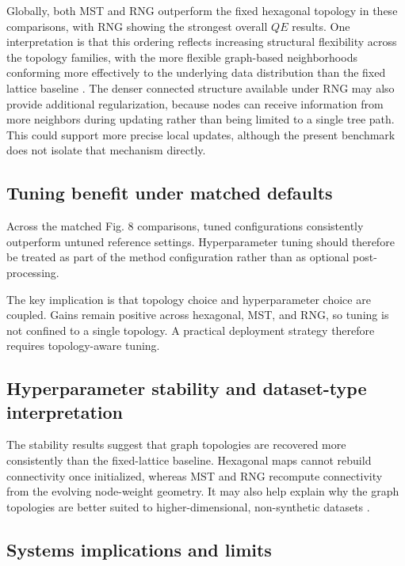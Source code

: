 \documentclass[11pt]{article}
\begin{document}
Globally, both MST and RNG outperform the fixed hexagonal topology in these comparisons, with RNG showing the strongest overall $QE$ results. One interpretation is that this ordering reflects increasing structural flexibility across the topology families, with the more flexible graph-based neighborhoods conforming more effectively to the underlying data distribution than the fixed lattice baseline \citep{kohonenEssentialsSelforganizingMap2013,kangasVariantsSelforganizingMaps1990,toussaintRelativeNeighbourhoodGraph1980}. The denser connected structure available under RNG may also provide additional regularization, because nodes can receive information from more neighbors during updating rather than being limited to a single tree path. This could support more precise local updates, although the present benchmark does not isolate that mechanism directly.

\subsection{Tuning benefit under matched defaults}

Across the matched Fig. 8 comparisons, tuned configurations consistently outperform untuned reference settings. Hyperparameter tuning should therefore be treated as part of the method configuration rather than as optional post-processing.

The key implication is that topology choice and hyperparameter choice are coupled. Gains remain positive across hexagonal, MST, and RNG, so tuning is not confined to a single topology. A practical deployment strategy therefore requires topology-aware tuning.

\subsection{Hyperparameter stability and dataset-type interpretation}

The stability results suggest that graph topologies are recovered more consistently than the fixed-lattice baseline. Hexagonal maps cannot rebuild connectivity once initialized, whereas MST and RNG recompute connectivity from the evolving node-weight geometry. It may also help explain why the graph topologies are better suited to higher-dimensional, non-synthetic datasets \citep{kohonenEssentialsSelforganizingMap2013,kangasVariantsSelforganizingMaps1990}.

\subsection{Systems implications and limits}
\end{document}

